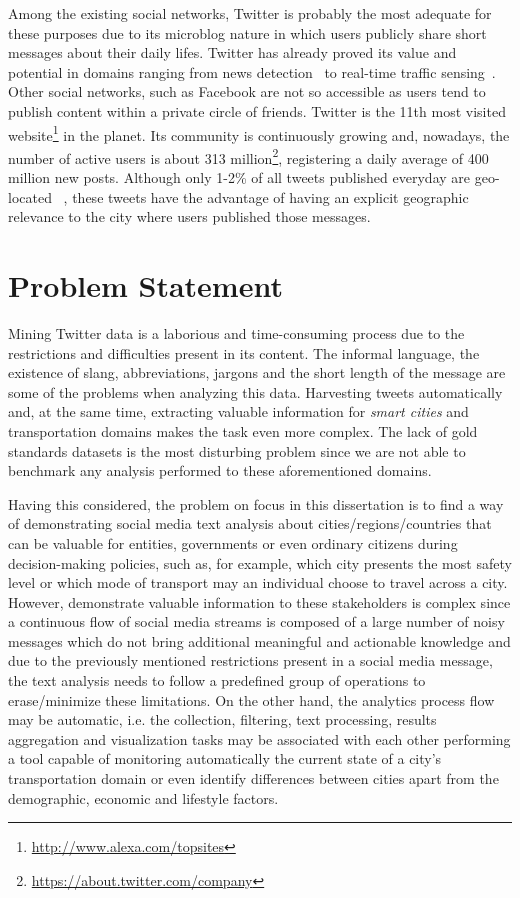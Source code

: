 Among the existing social networks, Twitter is probably the most adequate for these purposes due to its microblog nature in which users publicly share short messages about their daily lifes. Twitter has already proved its value and potential in domains ranging from news detection~\cite{kn:Sankaranarayanan2009} to real-time traffic sensing~\cite{carvalho2010real}. Other social networks, such as Facebook are not so accessible as users tend to publish content within a private circle of friends. Twitter is the 11th most visited website\footnote{\url{http://www.alexa.com/topsites}} in the planet. Its community is continuously growing and, nowadays, the number of active users is about 313 million\footnote{\url{https://about.twitter.com/company}}, registering a daily average of 400 million new posts. Although only 1-2\% of all tweets published everyday are geo-located ~\cite{ikeda2013twitter}, these tweets have the advantage of having an explicit geographic relevance to the city where users published those messages.

\section{Problem Statement}\label{sec:problem}

Mining Twitter data is a laborious and time-consuming process due to the restrictions and difficulties present in its content. The informal language, the existence of slang, abbreviations, jargons and the short length of the message are some of the problems when analyzing this data. Harvesting tweets automatically and, at the same time, extracting valuable information for \textit{smart cities} and transportation domains makes the task even more complex. The lack of gold standards datasets is the most disturbing problem since we are not able to benchmark any analysis performed to these aforementioned domains.

Having this considered, the problem on focus in this dissertation is to find a way of demonstrating social media text analysis about cities/regions/countries that can be valuable for entities, governments or even ordinary citizens during decision-making policies, such as, for example, which city presents the most safety level or which mode of transport may an individual choose to travel across a city. However, demonstrate valuable information to these stakeholders is complex since a continuous flow of social media streams is composed of a large number of noisy messages which do not bring additional meaningful and actionable knowledge and due to the previously mentioned restrictions present in a social media message, the text analysis needs to follow a predefined group of operations to erase/minimize these limitations. On the other hand, the analytics process flow may be automatic, i.e. the collection, filtering, text processing, results aggregation and visualization tasks may be associated with each other performing a tool capable of monitoring automatically the current state of a city's transportation domain or even identify differences between cities apart from the demographic, economic and lifestyle factors.

